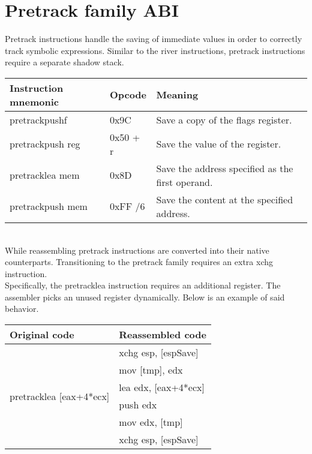 \documentclass[12pt]{report}
\begin{document}
\section{Pretrack family ABI}
\label{sec:pretrack-family-abi}
Pretrack instructions handle the saving of immediate values in order to correctly track symbolic expressions. Similar to the river instructions, pretrack instructions require a separate shadow stack.\\
\newline
\begin{tabular}{| l | l | l |}
	\hline
	\textbf{Instruction mnemonic} & \textbf{Opcode} & \textbf{Meaning}\\ \hline
	pretrackpushf & 0x9C & Save a copy of the flags register.\\ \hline
	pretrackpush reg & 0x50 + r & Save the value of the register.\\ \hline
	pretracklea mem & 0x8D & Save the address specified as the first operand.\\ \hline
	pretrackpush mem & 0xFF /6 & Save the content at the specified address.\\ \hline
\end{tabular}\\
\newline
While reassembling pretrack instructions are converted into their native counterparts. Transitioning to the pretrack family requires an extra xchg instruction.\\
\newline
Specifically, the pretracklea instruction requires an additional register. The assembler picks an unused register dynamically. Below is an example of said behavior.\\
\newline
\begin{tabular}{| l | l |}
	\hline
	\textbf{Original code} & \textbf{Reassembled code}\\ \hline
	\multirow{6}{*}{pretracklea [eax+4*ecx]} & xchg esp, [espSave]\\
	& mov [tmp], edx\\
	& lea edx, [eax+4*ecx]\\
	& push edx\\
	& mov edx, [tmp]\\
	& xchg esp, [espSave]\\ \hline
\end{tabular}
\end{document}

